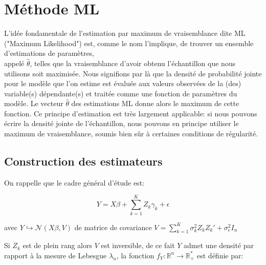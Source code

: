 \documentclass[11pt,fleqn]{book} %
\begin{document}
\newpage


   

\chapter{Méthode ML}


\vspace{1em}

L’idée fondamentale de l’estimation par maximum de vraisemblance dite ML ("Maximum Likelihood") est, comme le nom l’implique, de trouver un ensemble d’estimations de paramètres,\\ 
appelé $\hat{\theta}$, telles que la vraisemblance d’avoir obtenu l’échantillon que nous utilisons soit maximisée. Nous signifions par là que la densité de probabilité jointe pour le modèle que l’on estime est évaluée aux valeurs observées de la (des) variable(s) dépendante(s) et traitée comme une fonction de paramètres du modèle. Le vecteur $\hat{\theta}$ des estimations ML donne alors
le maximum de cette fonction. Ce principe d’estimation est très largement applicable: si nous pouvons écrire la densité jointe de l’échantillon, nous pouvons en principe utiliser le maximum de vraisemblance, soumis bien sûr à certaines conditions de régularité. 

\vspace{1em}

\section{Construction des estimateurs}

\vspace{1em}

On rappelle que le cadre général d'étude est: 

\begin{equation*} 
Y=X\beta+\sum_{k=1}^{K} Z_k \gamma_k+\epsilon 
\end{equation*}

avec \: $ Y\hookrightarrow\mathcal{N}(X\beta,V)$ \:de matrice de covariance $V=\sum_{k=1}^{K} \sigma_k^2 Z_k  Z_k'+\sigma_{\epsilon}^2 I_{n}$

  \vspace{1em}
 Si $Z_k$ est de plein rang alors $V$ est inversible, de ce fait $Y$ admet une densité par rapport à la mesure de Lebesgue $\lambda_{n}$, la fonction $f_{Y} : \mathbb{R}^{n} \rightarrow \mathbb{R}_{+}^{*}$ est définie par:
\end{document}
